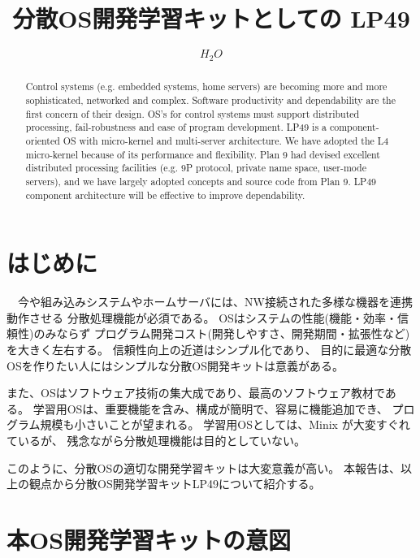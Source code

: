 \documentclass{jarticle}
\begin{document}

\title{\Large\bf  分散OS開発学習キットとしての LP49 }


\author{$H_2O$}

\maketitle



\begin{abstract}
  Control systems (e.g. embedded systems, home servers) are becoming more and more sophisticated, 
networked and complex. 
Software productivity and dependability are the first concern of their design. 
OS’s for control systems must support distributed processing, 
fail-robustness and ease of program development. 
LP49 is a component-oriented OS with micro-kernel and multi-server architecture. 
We have adopted the L4 micro-kernel because of its performance and flexibility. 
Plan 9 had devised excellent distributed processing facilities 
(e.g. 9P protocol, private name space, user-mode servers), 
and we have largely adopted concepts and source code from Plan 9. 
LP49 component architecture will be effective to improve dependability.

\end{abstract}



\section{はじめに}

　今や組み込みシステムやホームサーバには、NW接続された多様な機器を連携動作させる
分散処理機能が必須である。
OSはシステムの性能(機能・効率・信頼性)のみならず
プログラム開発コスト(開発しやすさ、開発期間・拡張性など)を大きく左右する。
信頼性向上の近道はシンプル化であり、
目的に最適な分散OSを作りたい人にはシンプルな分散OS開発キットは意義がある。

  また、OSはソフトウェア技術の集大成であり、最高のソフトウェア教材である。
学習用OSは、重要機能を含み、構成が簡明で、容易に機能追加でき、
プログラム規模も小さいことが望まれる。
学習用OSとしては、Minix が大変すぐれているが、
残念ながら分散処理機能は目的としていない。

このように、分散OSの適切な開発学習キットは大変意義が高い。
本報告は、以上の観点から分散OS開発学習キットLP49について紹介する。

\section{本OS開発学習キットの意図}\label{sec:Enum}\label{sec:item}
\end{document}
